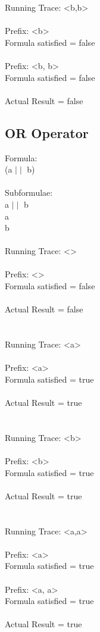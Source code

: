 \newpage

\noindent Running Trace: \textless b,b\textgreater\\
\\
  Prefix: \textless b\textgreater\\
  Formula satisfied = false\\
\\
  Prefix: \textless b, b\textgreater\\
  Formula satisfied = false\\
\\
  Actual Result = false\\

\subsection{OR Operator}

Formula:\\
(a  $ \mid \mid $  b)\\
\\
Subformulae:\\
a  $ \mid \mid $  b\\
a\\
b\\
\\
Running Trace: \textless \textgreater\\
\\
  Prefix: \textless \textgreater\\
  Formula satisfied = false\\
\\
  Actual Result = false\\
\\
\\
Running Trace: \textless a\textgreater\\
\\
  Prefix: \textless a\textgreater\\
  Formula satisfied = true\\
\\
  Actual Result = true\\
\\
\\
Running Trace: \textless b\textgreater\\
\\
  Prefix: \textless b\textgreater\\
  Formula satisfied = true\\
\\
  Actual Result = true\\
\\
\\
Running Trace: \textless a,a\textgreater\\
\\
  Prefix: \textless a\textgreater\\
  Formula satisfied = true\\
\\
  Prefix: \textless a, a\textgreater\\
  Formula satisfied = true\\
\\
  Actual Result = true\\

